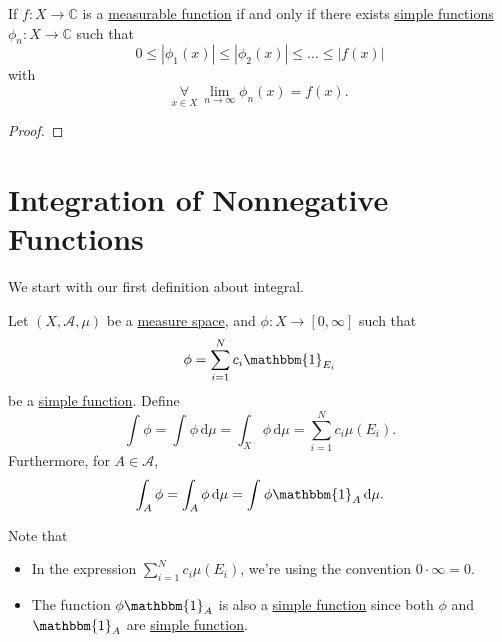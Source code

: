 \begin{corollary}
	If \(f\colon X\to \mathbb{C} \) is a \hyperref[def:measurable-function]{measurable function} if and only if there exists
	\hyperref[def:simple-function]{simple functions} \(\phi _{n}\colon X\to \mathbb{C}\) such that
	\[
		0\leq \left\vert \phi _1(x) \right\vert \leq \left\vert \phi _2(x) \right\vert \leq \dots \leq \left\vert f(x) \right\vert
	\]
	with
	\[
		\underset{x\in X}{\forall }\ \lim_{n \to \infty} \phi _{n}(x) = f(x).
	\]
\end{corollary}
\begin{proof}
\end{proof}

\section{Integration of Nonnegative Functions}
We start with our first definition about integral.
\begin{definition}\label{def:integration-of-nonnegative-function}
	Let \((X, \mathcal{A}, \mu  )\) be a \hyperref[def:measure-space]{measure space}, and \(\phi\colon X\to [0, \infty ]\) such that
	\[
		\phi  = \sum_{i=1}^{N} c_{i}\mathbbm{1}_{E_{i}}
	\]
	be a \hyperref[def:simple-function]{simple function}. Define
	\[
		\int_{}^{} \phi = \int_{}^{} \phi  \,\mathrm{d}\mu = \int_{X}^{} \phi  \,\mathrm{d}\mu = \sum_{i=1}^{N} c_{i}\mu (E_{i}).
	\]
	Furthermore, for \(A\in \mathcal{A} \),
	\[
		\int_{A}^{} \phi = \int_{A}^{} \phi  \,\mathrm{d}\mu = \int_{}^{} \phi \mathbbm{1}_{A}  \,\mathrm{d}\mu.
	\]
\end{definition}
\begin{note}
	Note that
	\begin{itemize}
		\item In the expression \(\sum_{i=1}^{N} c_{i}\mu (E_{i})\), we're using the convention \(0\cdot \infty = 0\).
		\item The function \(\phi \mathbbm{1}_{A} \) is also a \hyperref[def:simple-function]{simple function} since both \(\phi \) and
		      \(\mathbbm{1}_{A} \) are \hyperref[def:simple-function]{simple function}.
	\end{itemize}
\end{note}

